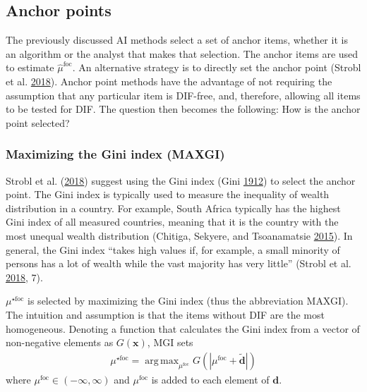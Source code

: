 \documentclass[
  11pt,
]{article}
\begin{document}
\hypertarget{anchor-points}{%
\subsection{Anchor points}\label{anchor-points}}

The previously discussed AI methods select a set of anchor items, whether it is an algorithm or the analyst that makes that selection. The anchor items are used to estimate \(\hat \mu^\text{foc}\). An alternative strategy is to directly set the anchor point (Strobl et al. \protect\hyperlink{ref-strobl2018anchor}{2018}). Anchor point methods have the advantage of not requiring the assumption that any particular item is DIF-free, and, therefore, allowing all items to be tested for DIF. The question then becomes the following: How is the anchor point selected?

\hypertarget{maximizing-the-gini-index-maxgi}{%
\subsubsection{Maximizing the Gini index (MAXGI)}\label{maximizing-the-gini-index-maxgi}}

Strobl et al. (\protect\hyperlink{ref-strobl2018anchor}{2018}) suggest using the Gini index (Gini \protect\hyperlink{ref-gini1912variabilita}{1912}) to select the anchor point. The Gini index is typically used to measure the inequality of wealth distribution in a country. For example, South Africa typically has the highest Gini index of all measured countries, meaning that it is the country with the most unequal wealth distribution (Chitiga, Sekyere, and Tsoanamatsie \protect\hyperlink{ref-chitiga2015income}{2015}). In general, the Gini index \enquote{takes high values if, for example, a small minority of persons has a lot of wealth while the vast majority has very little} (Strobl et al. \protect\hyperlink{ref-strobl2018anchor}{2018}, 7).

\(\mu^{\star\text{foc}}\) is selected by maximizing the Gini index (thus the abbreviation MAXGI). The intuition and assumption is that the items without DIF are the most homogeneous. Denoting a function that calculates the Gini index from a vector of non-negative elements as \(G(\mathbf{x})\), MGI sets
\begin{align}
\mu^{\star\text{foc}} = \mathop\mathrm{arg\,max}_{\mu^\text{foc}} G(|\mu^\text{foc} + \tilde{\mathbf{d}}|)
\end{align}
where \(\mu^\text{foc} \in (-\infty, \infty)\) and \(\mu^\text{foc}\) is added to each element of \(\mathbf{d}\).
\end{document}
